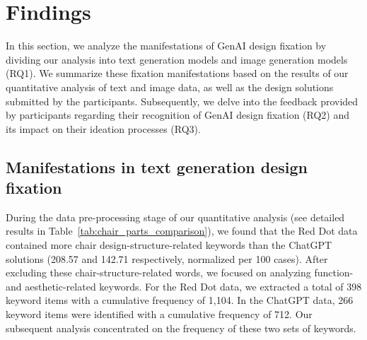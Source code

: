 \section{Findings}
\label{sec: result}
In this section, we analyze the manifestations of GenAI design fixation by dividing our analysis into text generation models and image generation models (RQ1). We summarize these fixation manifestations based on the results of our quantitative analysis of text and image data, as well as the design solutions submitted by the participants. Subsequently, we delve into the feedback provided by participants regarding their recognition of GenAI design fixation (RQ2) and its impact on their ideation processes (RQ3).

\subsection{Manifestations in text generation design fixation}
During the data pre-processing stage of our quantitative analysis (see detailed results in Table~\ref{tab:chair_parts_comparison}), we found that the Red Dot data contained more chair design-structure-related keywords than the ChatGPT solutions (208.57 and 142.71 respectively, normalized per 100 cases). After excluding these chair-structure-related words, we focused on analyzing function- and aesthetic-related keywords. For the Red Dot data, we extracted a total of 398 keyword items with a cumulative frequency of 1,104. In the ChatGPT data, 266 keyword items were identified with a cumulative frequency of 712. Our subsequent analysis concentrated on the frequency of these two sets of keywords.

